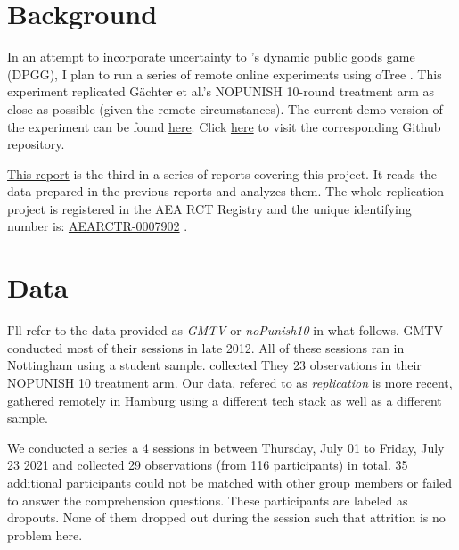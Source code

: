 \documentclass[11pt,]{article}
\begin{document}
\vskip -8.5pt



\noindent  

\hypertarget{background}{%
\section{Background}\label{background}}

In an attempt to incorporate uncertainty to \citet{GMTV2017}'s dynamic
public goods game (DPGG), I plan to run a series of remote online
experiments using oTree \citep{oTree}. This experiment replicated
Gächter et al.'s NOPUNISH 10-round treatment arm as close as possible
(given the remote circumstances). The current demo version of the
experiment can be found \href{https://cliccs.herokuapp.com/}{here}.
Click \href{https://github.com/Howquez/coopUncertainty}{here} to visit
the corresponding Github repository.

\href{https://github.com/Howquez/coopUncertainty/blob/July21Replication/analysis/reports/rmd/03_dataAnalyses.Rmd}{This
report} is the third in a series of reports covering this project. It
reads the data prepared in the previous reports and analyzes them. The
whole replication project is registered in the AEA RCT Registry and the
unique identifying number is:
\href{https://doi.org/10.1257/rct.7902-2.0}{AEARCTR-0007902}
\citep{preregistration}.

\hypertarget{data}{%
\section{Data}\label{data}}

I'll refer to the data \citet{GMTV2017} provided as \emph{GMTV} or
\emph{noPunish10} in what follows. GMTV conducted most of their sessions
in late 2012. All of these sessions ran in Nottingham using a student
sample. collected They 23 observations in their NOPUNISH 10 treatment
arm. Our data, refered to as \emph{replication} is more recent, gathered
remotely in Hamburg using a different tech stack as well as a different
sample.

We conducted a series a 4 sessions in between Thursday, July 01 to
Friday, July 23 2021 and collected 29 observations (from 116
participants) in total. 35 additional participants could not be matched
with other group members or failed to answer the comprehension
questions. These participants are labeled as dropouts. None of them
dropped out during the session such that attrition is no problem here.
\end{document}
